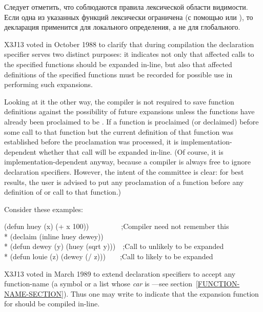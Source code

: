 \begin{flushdesc}
Следует отметить, что соблюдаются правила лексической области видимости. Если
одна из указанных функций лексически ограничена (с помощью  или
), то декларация применится для локального определения, а не для
глобального.

\begin{newer}
X3J13 voted in October 1988 
to clarify that during compilation the  declaration specifier
serves two distinct purposes: it indicates not only that affected calls
to the specified functions should be expanded in-line, but also that
affected definitions of the specified functions must be recorded for
possible use in performing such expansions.

Looking at it the other way,
the compiler is not required to save function definitions against the
possibility of future expansions unless the functions have already been
proclaimed to be .  If a function is proclaimed (or declaimed)
before some call to that function but the current definition of that
function was established before the proclamation was processed,
it is implementation-dependent whether that call will be expanded in-line.
(Of course, it is implementation-dependent anyway, because a compiler
is always free to ignore  declaration specifiers.
However, the intent of the committee is clear: for best results,
the user is advised to put any  proclamation of
a function before any definition of or call to that function.)

Consider these examples:
\begin{lisp}
(defun huey (x) (+ x 100))~~~~~~~~~;\textrm{Compiler need not remember this} \\*
(declaim (inline huey dewey)) \\*
(defun dewey (y) (huey (sqrt y)))~~;\textrm{Call to  unlikely to be expanded} \\*
(defun louie (z) (dewey (/ z)))~~~~;\textrm{Call to  likely to be expanded}
\end{lisp}
\goodbreak

X3J13 voted in March 1989  to extend 
declaration specifiers
to accept any function-name (a symbol or a list
whose \emph{car} is ---see section~\ref{FUNCTION-NAME-SECTION}).
Thus one may write  to indicate
that the 
expansion function for  should be compiled in-line.
\end{newer}


\end{flushdesc}
